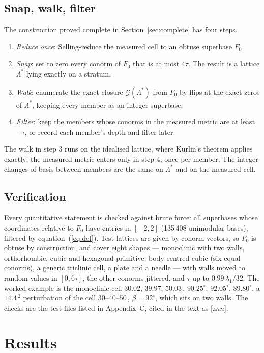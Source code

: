 \documentclass[preprint,pdf]{iucr}          %
\newcommand{\Ang}{\text{\AA}}
\newcommand{\Cl}{\mathcal{G}}
\begin{document}
\subsection{Snap, walk, filter}
The construction proved complete in Section~\ref{sec:complete} has four steps.
\begin{enumerate}
\item \emph{Reduce once}: Selling-reduce the measured cell to an obtuse superbase $F_0$.
\item \emph{Snap}: set to zero every conorm of $F_0$ that is at most $4\tau$. The result is a lattice $\Lambda^*$ lying exactly on a stratum.
\item \emph{Walk}: enumerate the exact closure $\Cl(\Lambda^*)$ from $F_0$ by flips at the exact zeros of $\Lambda^*$, keeping every member as an integer superbase.
\item \emph{Filter}: keep the members whose conorms in the measured metric are at least $-\tau$, or record each member's depth and filter later.
\end{enumerate}
The walk in step 3 runs on the idealised lattice, where Kurlin's theorem applies exactly; the measured metric enters only in step 4, once per member. The integer changes of basis between members are the same on $\Lambda^*$ and on the measured cell.

\subsection{Verification}
Every quantitative statement is checked against brute force: all superbases whose coordinates relative to $F_0$ have entries in $[-2,2]$ (135\,408 unimodular bases), filtered by equation~(\ref{eq:def}). Test lattices are given by conorm vectors, so $F_0$ is obtuse by construction, and cover eight shapes --- monoclinic with two walls, orthorhombic, cubic and hexagonal primitive, body-centred cubic (six equal conorms), a generic triclinic cell, a plate and a needle --- with walls moved to random values in $[0,6\tau]$, the other conorms jittered, and $\tau$ up to $0.99\,\lambda_1/32$. The worked example is the monoclinic cell $30.02$, $39.97$, $50.03$\,\Ang, $90.25^\circ$, $92.05^\circ$, $89.80^\circ$, a $14.4$\,\Ang$^2$ perturbation of the cell $30$--$40$--$50$\,\Ang, $\beta=92^\circ$, which sits on two walls. The checks are the test files listed in Appendix~C, cited in the text as [z$nn$].

\section{Results}
\label{sec:results}
\end{document}
